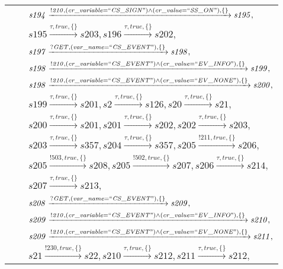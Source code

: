 \begin{tabular}{lcp{350px}}
& & $\mathit{s194}\xrightarrow{\mathit{!210}, \mathit{(cr\_variable = ``CS\_SIGN") \land (cr\_value = ``SS\_ON")}, \{\}}\mathit{s195},$ \\
& & $\mathit{s195}\xrightarrow{\mathit{\tau}, \mathit{true}, \{\}}\mathit{s203},\mathit{s196}\xrightarrow{\mathit{\tau}, \mathit{true}, \{\}}\mathit{s202},$ \\
& & $\mathit{s197}\xrightarrow{\mathit{?GET}, \mathit{(var\_name = ``CS\_EVENT")}, \{\}}\mathit{s198},$ \\
& & $\mathit{s198}\xrightarrow{\mathit{!210}, \mathit{(cr\_variable = ``CS\_EVENT") \land (cr\_value = ``EV\_INFO")}, \{\}}\mathit{s199},$ \\
& & $\mathit{s198}\xrightarrow{\mathit{!210}, \mathit{(cr\_variable = ``CS\_EVENT") \land (cr\_value = ``EV\_NONE")}, \{\}}\mathit{s200},$ \\
& & $\mathit{s199}\xrightarrow{\mathit{\tau}, \mathit{true}, \{\}}\mathit{s201},\mathit{s2}\xrightarrow{\mathit{\tau}, \mathit{true}, \{\}}\mathit{s126},\mathit{s20}\xrightarrow{\mathit{\tau}, \mathit{true}, \{\}}\mathit{s21},$ \\
& & $\mathit{s200}\xrightarrow{\mathit{\tau}, \mathit{true}, \{\}}\mathit{s201},\mathit{s201}\xrightarrow{\mathit{\tau}, \mathit{true}, \{\}}\mathit{s202},\mathit{s202}\xrightarrow{\mathit{\tau}, \mathit{true}, \{\}}\mathit{s203},$ \\
& & $\mathit{s203}\xrightarrow{\mathit{\tau}, \mathit{true}, \{\}}\mathit{s357},\mathit{s204}\xrightarrow{\mathit{\tau}, \mathit{true}, \{\}}\mathit{s357},\mathit{s205}\xrightarrow{\mathit{!211}, \mathit{true}, \{\}}\mathit{s206},$ \\
& & $\mathit{s205}\xrightarrow{\mathit{!503}, \mathit{true}, \{\}}\mathit{s208},\mathit{s205}\xrightarrow{\mathit{!502}, \mathit{true}, \{\}}\mathit{s207},\mathit{s206}\xrightarrow{\mathit{\tau}, \mathit{true}, \{\}}\mathit{s214},$ \\
& & $\mathit{s207}\xrightarrow{\mathit{\tau}, \mathit{true}, \{\}}\mathit{s213},$ \\
& & $\mathit{s208}\xrightarrow{\mathit{?GET}, \mathit{(var\_name = ``CS\_EVENT")}, \{\}}\mathit{s209},$ \\
& & $\mathit{s209}\xrightarrow{\mathit{!210}, \mathit{(cr\_variable = ``CS\_EVENT") \land (cr\_value = ``EV\_INFO")}, \{\}}\mathit{s210},$ \\
& & $\mathit{s209}\xrightarrow{\mathit{!210}, \mathit{(cr\_variable = ``CS\_EVENT") \land (cr\_value = ``EV\_NONE")}, \{\}}\mathit{s211},$ \\
& & $\mathit{s21}\xrightarrow{\mathit{!230}, \mathit{true}, \{\}}\mathit{s22},\mathit{s210}\xrightarrow{\mathit{\tau}, \mathit{true}, \{\}}\mathit{s212},\mathit{s211}\xrightarrow{\mathit{\tau}, \mathit{true}, \{\}}\mathit{s212},$ \\
\end{tabular}

